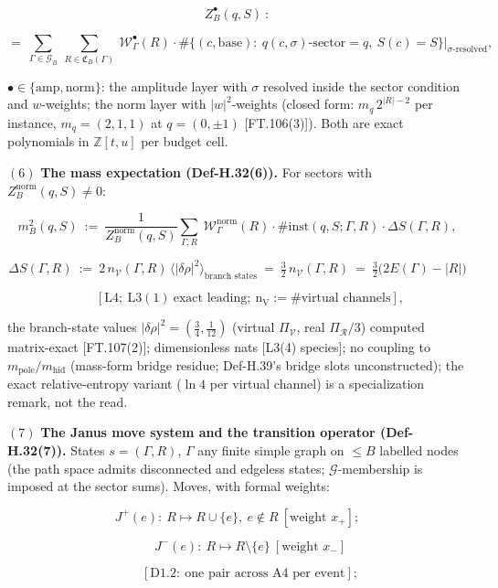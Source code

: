\begin{definition}
\[
Z^{\bullet}_{B}(q,S)\ :
\]

\[
= \ \sum_{\Gamma\in\mathcal G_B}\ \sum_{R\in\mathfrak C_B(\Gamma)}\ \mathcal W^{\bullet}_\Gamma(R)\cdot\#\{(c,\text{base}):\ q(c,\sigma)\text{-sector}=q,\ S(c)=S\}\Big|_{\sigma\text{-resolved}},
\]

$\bullet\in\{\mathrm{amp},\mathrm{norm}\}$: the amplitude layer with $\sigma$ resolved inside the sector condition and $w$-weights; the norm layer with $|w|^2$-weights (closed form: $m_q\,2^{|R|-2}$ per instance, $m_q=(2,1,1)$ at $q=(0,\pm1)$ [FT.106(3)]). Both are exact polynomials in $\mathbb Z[t,u]$ per budget cell.

$(6)$ \textbf{The mass expectation (Def-H.32(6)).} For sectors with $Z^{\mathrm{norm}}_B(q,S)\ne0$:

\[
m^2_B(q,S)\ :=\ \frac{1}{Z^{\mathrm{norm}}_B(q,S)}\sum_{\Gamma,R}\ \mathcal W^{\mathrm{norm}}_\Gamma(R)\cdot\#\text{inst}(q,S;\Gamma,R)\cdot\Delta S(\Gamma,R),
\]

\[
\Delta S(\Gamma,R)\ :=\ 2\,n_{\mathcal V}(\Gamma,R)\,\bigl\langle|\delta\rho|^2\bigr\rangle_{\text{branch states}}\ =\ \tfrac32\,n_{\mathcal V}(\Gamma,R)\ =\ \tfrac32\bigl(2E(\Gamma)-|R|\bigr)
\]

\[
\qquad [\mathrm{L4};\ \mathrm{L3}(1)\ \text{exact leading};\ \mathrm{n}_\mathrm{V}:=\#\text{virtual channels}],
\]

the branch-state values $|\delta\rho|^2=(\tfrac34,\tfrac1{12})$ (virtual $\Pi_{\mathcal V}$, real $\Pi_{\mathcal R}/3$) computed matrix-exact [FT.107(2)]; dimensionless nats [L3(4) species]; no coupling to $m_{\mathrm{pole}}/m_{\mathrm{hid}}$ (mass-form bridge residue; Def-H.39's bridge slots unconstructed); the exact relative-entropy variant ($\ln4$ per virtual channel) is a specialization remark, not the read.

$(7)$ \textbf{The Janus move system and the transition operator (Def-H.32(7)).} States $s=(\Gamma,R)$, $\Gamma$ any finite simple graph on $\le B$ labelled nodes (the path space admits disconnected and edgeless states; $\mathcal G$-membership is imposed at the sector sums). Moves, with formal weights:

\[
J^+(e):\ R\mapsto R\cup\{e\},\ e\notin R\ [\text{weight }x_+];
\]

\[
\qquad J^-(e):\ R\mapsto R\setminus\{e\}\ [\text{weight }x_-]
\]

\[
\qquad [\mathrm{D1.2}:\ \text{one pair across A4 per event}];
\]


\end{definition}
